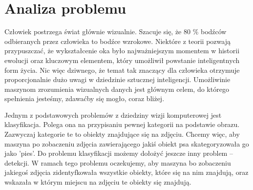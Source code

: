 \documentclass[a4paper,twoside,12pt]{book}
\begin{document}
\section{Analiza problemu}
{Człowiek postrzega świat głównie wizualnie. Szacuje się, że 80 \% bodźców odbieranych przez człowieka to bodźce wzrokowe. Niektóre z teorii \cite{nilsson2013eye} pozwają przypuszczać, że wykształcenie oka było najważniejszym momentem w historii ewolucji oraz kluczowym elementem, który umożliwił powstanie inteligentnych form życia. Nic więc dziwnego, że temat tak znaczący dla człowieka otrzymuje proporcjonalnie dużo uwagi w dziedzinie sztucznej inteligencji. Umożliwinie maszynom zrozumienia wizualnych danych jest głównym celem, do którego spełnienia jesteśmy, zdawaćby się mogło, coraz bliżej.}

{Jednym z podstawowych problemów z dziedziny wizji komputerowej jest klasyfikacja. Polega ona na przypisaniu pewnej kategorii na podstawie obrazu. Zazwyczaj kategorie te to obiekty znajdujące się na zdjęciu. Chcemy więc, aby maszyna po zobaczeniu zdjęcia zawierającego jakiś obiekt  psa skategoryzowała go jako 'pies'. Do problemu klasyfikacji możemy dołożyć jeszcze inny problem – detekcji. W ramach tego problemu oczekujemy, aby maszyna bo zobaczeniu jakiegoś zdjęcia zidentyfkowała wszystkie obiekty, które się na nim znajdują, oraz wskazała w którym miejscu na zdjęciu te obiekty się znajdują.}
\end{document}
